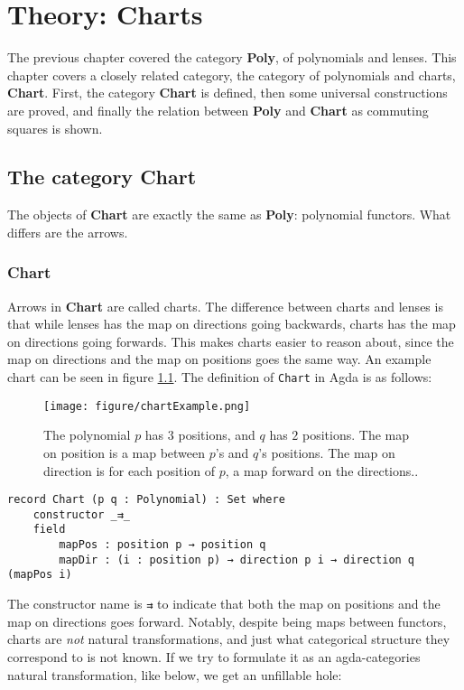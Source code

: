 \chapter{Theory: Charts}\label{chapter:charts}
The previous chapter covered the category \textbf{Poly}, of polynomials and lenses. This chapter covers a closely related category, the category of polynomials and charts, \textbf{Chart}. First, the category \textbf{Chart} is defined, then some universal constructions are proved, and finally the relation between \textbf{Poly} and \textbf{Chart} as commuting squares is shown.

\section{The category \textbf{Chart}}
The objects of \textbf{Chart} are exactly the same as \textbf{Poly}: polynomial functors. What differs are the arrows. 

\subsection{Chart}
Arrows in \textbf{Chart} are called charts. The difference between charts and lenses is that while lenses has the map on directions going backwards, charts has the map on directions going forwards. This makes charts easier to reason about, since the map on directions and the map on positions goes the same way. An example chart can be seen in figure \ref{fig:exampleChart}. The definition of \texttt{Chart} in Agda is as follows:

\begin{figure}
    \centering
    \texttt{[image: figure/chartExample.png]}
    \caption{The polynomial $p$ has $3$ positions, and $q$ has $2$ positions. The map on position is a map between $p$'s and $q$'s positions. The map on direction is for each position of $p$, a map forward on the directions..}
    \label{fig:exampleChart}
\end{figure}

\begin{verbatim}
record Chart (p q : Polynomial) : Set where
    constructor _⇉_
    field
        mapPos : position p → position q
        mapDir : (i : position p) → direction p i → direction q (mapPos i)
\end{verbatim}

The constructor name is \texttt{⇉} to indicate that both the map on positions and the map on directions goes forward. Notably, despite being maps between functors, charts are \textit{not} natural transformations, and just what categorical structure they correspond to is not known. If we try to formulate it as an agda-categories natural transformation, like below, we get an unfillable hole:

